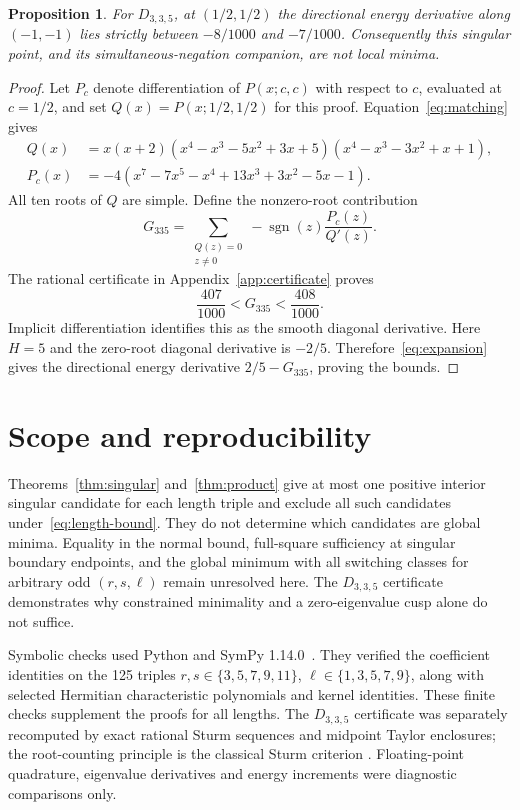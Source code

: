 \documentclass[11pt,a4paper]{article}
\newtheorem{proposition}[theorem]{Proposition}
\theoremstyle{remark}
\DeclareMathOperator{\sgn}{sgn}
\begin{document}
\begin{proposition}\label{prop:335}
For $D_{3,3,5}$, at $(1/2,1/2)$ the directional energy derivative
along $(-1,-1)$ lies strictly between $-8/1000$ and $-7/1000$.
Consequently this singular point, and its simultaneous-negation
companion, are not local minima.
\end{proposition}

\begin{proof}
Let $P_c$ denote differentiation of $P(x;c,c)$ with respect to $c$,
evaluated at $c=1/2$, and set $Q(x)=P(x;1/2,1/2)$ for this proof.
Equation~\eqref{eq:matching} gives
\begin{align}
 Q(x)&=x(x+2)(x^4-x^3-5x^2+3x+5)
                    (x^4-x^3-3x^2+x+1),\label{eq:335-Q}\\
 P_c(x)&=-4(x^7-7x^5-x^4+13x^3+3x^2-5x-1).
                    \label{eq:335-Pc}
\end{align}
All ten roots of $Q$ are simple. Define the nonzero-root contribution
\[
 G_{335}=\sum_{\substack{Q(z)=0\\z\ne0}}
               -\sgn(z)\frac{P_c(z)}{Q'(z)}.
\]
The rational certificate in Appendix~\ref{app:certificate} proves
\[
 \frac{407}{1000}<G_{335}<\frac{408}{1000}.
\]
Implicit differentiation identifies this as the smooth diagonal
derivative. Here $H=5$ and the zero-root diagonal derivative is
$-2/5$. Therefore~\eqref{eq:expansion} gives the directional
energy derivative $2/5-G_{335}$, proving the bounds.
\end{proof}

\section{Scope and reproducibility}

Theorems~\ref{thm:singular} and~\ref{thm:product} give at most one
positive interior singular candidate for each length triple and
exclude all such candidates under~\eqref{eq:length-bound}.
They do not determine which candidates are global minima.
Equality in the normal bound, full-square sufficiency at singular
boundary endpoints, and the global minimum with all switching
classes for arbitrary odd $(r,s,\ell)$ remain unresolved here.
The $D_{3,3,5}$ certificate demonstrates why constrained minimality
and a zero-eigenvalue cusp alone do not suffice.

Symbolic checks used Python and SymPy 1.14.0~\cite{Meurer2017}.
They verified the coefficient identities on the 125 triples
$r,s\in\{3,5,7,9,11\}$, $\ell\in\{1,3,5,7,9\}$, along with
selected Hermitian characteristic polynomials and kernel identities.
These finite checks supplement the proofs for all lengths.
The $D_{3,3,5}$ certificate was separately recomputed by exact
rational Sturm sequences and midpoint Taylor enclosures; the
root-counting principle is the classical Sturm criterion
\cite[Section 1]{GonzalezEtAl1989}.
Floating-point quadrature, eigenvalue derivatives and energy
increments were diagnostic comparisons only.
\end{document}

